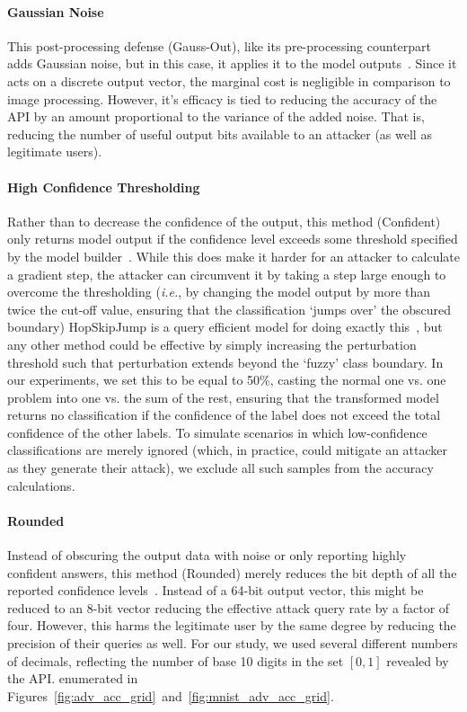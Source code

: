 \documentclass[lettersize,journal]{IEEEtran}
\newcommand{\ie}{\textit{i.e.}\xspace}
\begin{document}
\paragraph{Gaussian Noise}
This post-processing defense (Gauss-Out), like its pre-processing counterpart adds Gaussian noise, but in this case, it applies it to the model outputs~\cite{gauss_out}. Since it acts on a discrete output vector, the marginal cost is negligible in comparison to image processing. However, it's efficacy is tied to reducing the accuracy of the API by an amount proportional to the variance of the added noise. That is, reducing the number of useful output bits available to an attacker (as well as legitimate users).

\paragraph{High Confidence Thresholding}
Rather than to decrease the confidence of the output, this method (Confident) only returns model output if the confidence level exceeds some threshold specified by the model builder~\cite{high_conf}. While this does make it harder for an attacker to calculate a gradient step, the attacker can circumvent it by taking a step large enough to overcome the thresholding (\ie, by changing the model output by more than twice the cut-off value, ensuring that the classification `jumps over' the obscured boundary) HopSkipJump is a query efficient model for doing exactly this~\cite{hopskipjump}, but any other method could be effective by simply increasing the perturbation threshold such that perturbation extends beyond the `fuzzy' class boundary. In our experiments, we set this to be equal to 50\%, casting the normal one vs. one problem into one vs. the sum of the rest, ensuring that the transformed model returns no classification if the confidence of the label does not exceed the total confidence of the other labels. To simulate scenarios in which low-confidence classifications are merely ignored (which, in practice, could mitigate an attacker as they generate their attack), we exclude all such samples from the accuracy calculations.


\paragraph{Rounded}
Instead of obscuring the output data with noise or only reporting highly confident answers, this method (Rounded) merely reduces the bit depth of all the reported confidence levels~\cite{discretization}. Instead of a 64-bit output vector, this might be reduced to an 8-bit vector reducing the effective attack query rate by a factor of four. However, this harms the legitimate user by the same degree by reducing the precision of their queries as well. For our study, we used several different numbers of decimals, reflecting the number of base 10 digits in the set $[0,1]$ revealed by the API. enumerated in Figures~\ref{fig:adv_acc_grid}~and~\ref{fig:mnist_adv_acc_grid}. 
\end{document}
